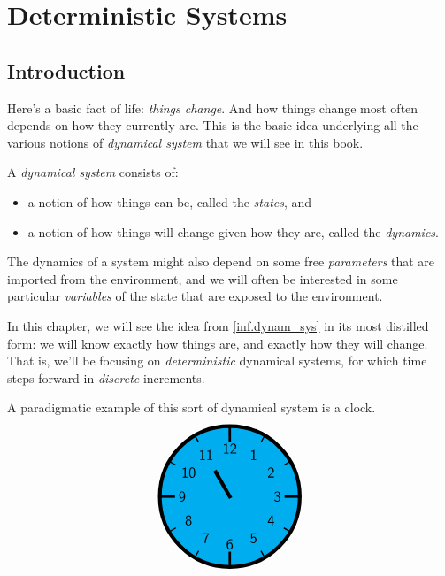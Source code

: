 \documentclass[DynamicalBook]{subfiles}
\begin{document}
%




\setcounter{chapter}{0}%


\chapter{Deterministic Systems}\label{chapter.1}

\section{Introduction}\label{sec.chap1_intro}

Here's a basic fact of life: \emph{things change}. And how things change most
often depends on how they currently are. This is the basic idea underlying all the various notions of \emph{dynamical
  system} that we will see in this book.

\begin{informal}\label{inf.dynam_sys}
  A \emph{dynamical system} consists of:
  \begin{itemize}
  \item a notion of how things can be, called the \emph{states}, and
  \item a notion of how things will change given how they are, called the \emph{dynamics}.
  \end{itemize}
  The dynamics of a system might also depend on some free \emph{parameters} that are imported from the environment, and
  we will often be interested in some particular \emph{variables} of the
  state that are exposed to the environment. 
\end{informal}

In this chapter, we will see the idea from \cref{inf.dynam_sys} in its
most distilled form: we will know exactly how things are, and exactly how they will change. That is, we'll be focusing on \emph{deterministic} dynamical systems,
for which time steps forward in \emph{discrete} increments.


A paradigmatic example of this sort of dynamical system is a clock.
\[
\begin{tikzpicture}[line cap=rect,line width=3pt]
\filldraw [fill=cyan] (0,0) circle [radius=2cm];
\foreach \angle [count=\xi] in {60,30,...,-270}
{
  \draw[line width=1pt] (\angle:1.8cm) -- (\angle:2cm);
  \node[font=\large] at (\angle:1.36cm) {\textsf{\xi}};
}
\foreach \angle in {0,90,180,270}
  \draw[line width=2pt] (\angle:1.6cm) -- (\angle:2cm);
\draw (0,0) -- (120:0.8cm);
\end{tikzpicture}
\]
\end{document}
